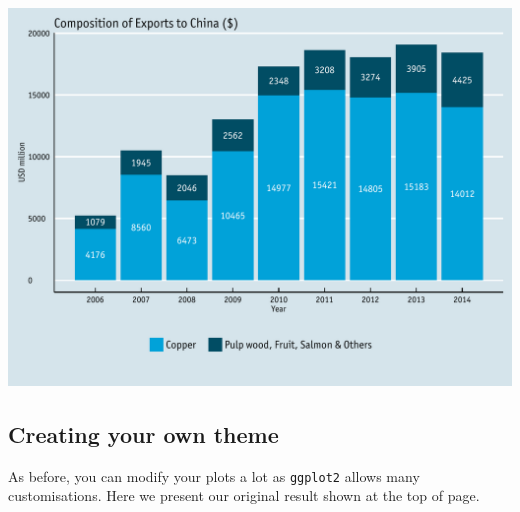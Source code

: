 \documentclass[]{article}
\begin{document}
\begin{center}\includegraphics{0_all_posts_pdf/bar_11-1} \end{center}

\subsection{Creating your own theme}\label{creating-your-own-theme-2}

As before, you can modify your plots a lot as \texttt{ggplot2} allows
many customisations. Here we present our original result shown at the
top of page.
\end{document}
